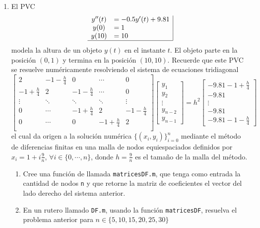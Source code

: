 \documentclass[legalpaper,11pt]{article}
\begin{document}
\begin{enumerate}
\newpage
{}
\item El PVC
$$
\begin{array}{cl|}
y''(t)	&=-0.5y'(t)+9.81\\
y(0)	&=1\\
y(10)	&=10\\ \hline
\end{array}
$$
modela la altura de un objeto $y(t)$ en el instante $t$. El objeto parte en la posici\'on $(0,1)$ y termina en la posici\'on $(10,10)$. Recuerde que este PVC se resuelve num\'ericamente resolviendo el sistema de ecuaciones tridiagonal
$$
\begin{bmatrix}
2 & -1-\frac{h}{4} & 0 & \cdots & 0 \\
-1+\frac{h}{4} & 2 & -1-\frac{h}{4} & \cdots& 0 \\
\vdots & \ddots & \ddots & \ddots &\vdots \\
0 & \cdots &-1+\frac{h}{4} & 2 & -1-\frac{h}{4} \\
0 & \cdots & 0 &-1+\frac{h}{4} & 2  \\
\end{bmatrix}
\begin{bmatrix}
y_1\\y_2\\\vdots \\y_{n-2}\\y_{n-1}
\end{bmatrix}
=
h^2\begin{bmatrix}
-9.81-1+\frac{h}{4}\\
-9.81\\
\vdots \\
-9.81\\
-9.81-1-\frac{h}{4}
\end{bmatrix}
$$
el cual da origen a la soluci\'on num\'erica $\{(x_i,y_i)\}_{i=0}^n$ mediante el m\'etodo de diferencias finitas en una malla de nodos equiespaciados definidos por $x_i=1+i\frac{9}{n}$, $\forall i \in\{0,\cdots, n\}$, donde $h=\frac{9}{n}$ es el tama\~{n}o de la malla del m\'etodo.

\begin{enumerate}
\item {} Cree una funci\'on de llamada \texttt{matricesDF.m}, que tenga como entrada la cantidad de nodos \texttt{n} y que retorne la matriz de coeficientes el vector del lado derecho del sistema anterior.

\item {} En un rutero llamado \texttt{DF.m}, usando la funci\'on \texttt{matricesDF}, resuelva el problema anterior para $n\in \{5,10,15,20,25,30\}$


\end{enumerate}
\end{enumerate}
\end{document}
